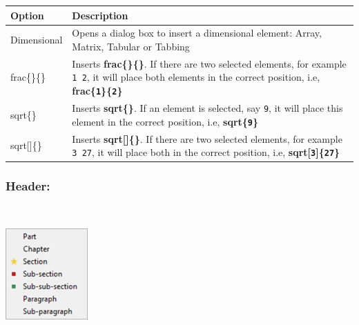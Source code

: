 \begin{scriptsize}
  \begin{tabularx}{\textwidth}{>{\hsize=0.2\hsize}X>{\hsize=0.8\hsize}X}\\
    \hline
    \textbf{Option} & \textbf{Description} \\
    \hline
    Dimensional & Opens a dialog box to insert a dimensional element: Array, Matrix, Tabular or Tabbing \\
    \hdashline[1pt/1pt]
    frac\{\}\{\} & Inserts \textbf{frac\{\}\{\}}. If there are two selected elements,
     for example \texttt{1 2}, it will place both elements in the correct position, i.e,
     \textbf{frac\{\texttt{1}\}\{\texttt{2}\}} \\
    sqrt\{\} & Inserts \textbf{sqrt\{\}}. If an element is selected, say \texttt{9},
     it will place this element in the correct position, i.e, \textbf{sqrt\{\texttt{9}\}} \\
    sqrt[]\{\} & Inserts \textbf{sqrt[]\{\}}. If there are two selected elements, for example
     \texttt{3 27}, it will place both in the correct position, i.e, \textbf{sqrt[\texttt{3}]\{\texttt{27}\}} \\
    \hline
  \end{tabularx}
\end{scriptsize}


\newpage
\hypertarget{menu_insert_latex_header}{}
\subsubsection{Header:}\\

\includegraphics[scale=0.50]{./res/menu_insert_latex_header.png}\\

